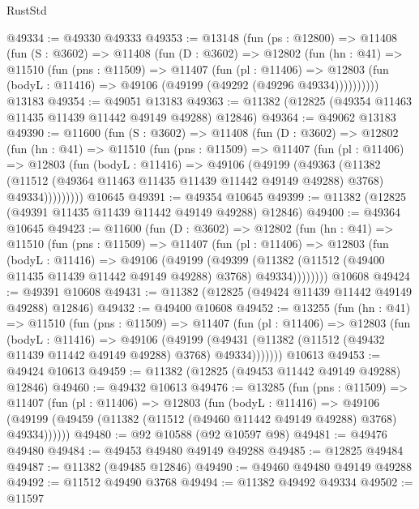 \begin{lexlean}{RustStd}
\begin{coremodule}
@49334 := @49330 @49333
@49353 := @13148
    (fun (ps : @12800) =>
    @11408
      (fun (S : @3602) =>
      @11408
        (fun (D : @3602) =>
        @12802
          (fun (hn : @41) =>
          @11510
            (fun (pns : @11509) =>
            @11407
              (fun (pl : @11406) =>
              @12803 (fun (bodyL : @11416) => @49106 (@49199 (@49292 (@49296 @49334))))))))))
    @13183
@49354 := @49051 @13183
@49363 := @11382 (@12825 (@49354 @11463 @11435 @11439 @11442 @49149 @49288) @12846)
@49364 := @49062 @13183
@49390 := @11600
    (fun (S : @3602) =>
    @11408
      (fun (D : @3602) =>
      @12802
        (fun (hn : @41) =>
        @11510
          (fun (pns : @11509) =>
          @11407
            (fun (pl : @11406) =>
            @12803
              (fun (bodyL : @11416) =>
              @49106
                (@49199
                  (@49363
                    (@11382
                      (@11512 (@49364 @11463 @11435 @11439 @11442 @49149 @49288) @3768)
                      @49334)))))))))
    @10645
@49391 := @49354 @10645
@49399 := @11382 (@12825 (@49391 @11435 @11439 @11442 @49149 @49288) @12846)
@49400 := @49364 @10645
@49423 := @11600
    (fun (D : @3602) =>
    @12802
      (fun (hn : @41) =>
      @11510
        (fun (pns : @11509) =>
        @11407
          (fun (pl : @11406) =>
          @12803
            (fun (bodyL : @11416) =>
            @49106
              (@49199
                (@49399
                  (@11382 (@11512 (@49400 @11435 @11439 @11442 @49149 @49288) @3768) @49334))))))))
    @10608
@49424 := @49391 @10608
@49431 := @11382 (@12825 (@49424 @11439 @11442 @49149 @49288) @12846)
@49432 := @49400 @10608
@49452 := @13255
    (fun (hn : @41) =>
    @11510
      (fun (pns : @11509) =>
      @11407
        (fun (pl : @11406) =>
        @12803
          (fun (bodyL : @11416) =>
          @49106
            (@49199
              (@49431 (@11382 (@11512 (@49432 @11439 @11442 @49149 @49288) @3768) @49334)))))))
    @10613
@49453 := @49424 @10613
@49459 := @11382 (@12825 (@49453 @11442 @49149 @49288) @12846)
@49460 := @49432 @10613
@49476 := @13285
    (fun (pns : @11509) =>
    @11407
      (fun (pl : @11406) =>
      @12803
        (fun (bodyL : @11416) =>
        @49106 (@49199 (@49459 (@11382 (@11512 (@49460 @11442 @49149 @49288) @3768) @49334))))))
@49480 := @92 @10588 (@92 @10597 @98)
@49481 := @49476 @49480
@49484 := @49453 @49480 @49149 @49288
@49485 := @12825 @49484
@49487 := @11382 (@49485 @12846)
@49490 := @49460 @49480 @49149 @49288
@49492 := @11512 @49490 @3768
@49494 := @11382 @49492 @49334
@49502 := @11597

\end{coremodule}
\end{lexlean}
